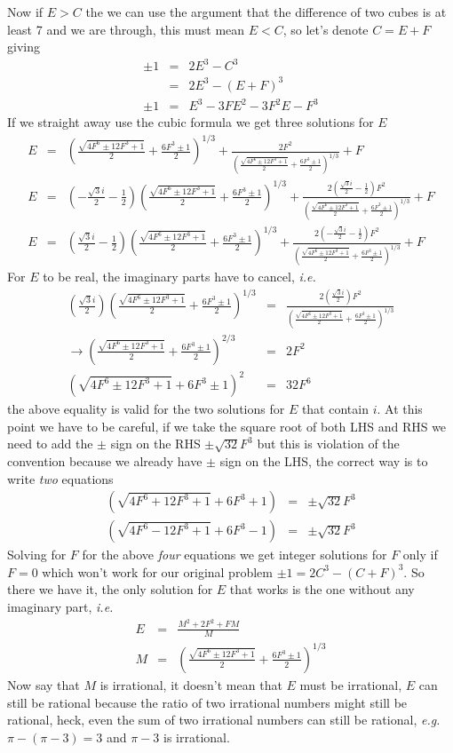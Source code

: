 \documentclass[aps,preprint,preprintnumbers,nofootinbib,showpacs,prd]{revtex4-1}
\newcommand{\ie}{{\it i.e.} }
\newcommand{\eg}{{\it e.g.} }
\newcommand{\nbea}{\begin{eqnarray*}}
\newcommand{\neea}{\end{eqnarray*}}
\begin{document}
Now if $E > C$ the we can use the argument that the difference of two cubes is at least 7 and we are through, this must mean $E < C$, so let's denote $C = E + F$ giving
%
\nbea
\pm 1 & = & 2 E^3 - C^3 \\
& = & 2E^3 - (E + F)^3 \\
\pm 1 & = & E^3-3FE^2-3F^2E-F^3
\neea
%
If we straight away use the cubic formula we get three solutions for $E$
%
\nbea
E & = & \left (\frac{\sqrt{4F^6\pm12F^3+1}}{2}+\frac{6F^3\pm1}{2} \right )^{1/3}+
\frac{2F^2}{  \left (\frac{\sqrt{4F^6\pm12F^3+1}}{2}+\frac{6F^3\pm1}{2} \right )^{1/3}  }+ F \\
E & = & \left ( -\frac{\sqrt{3}i}{2}-\frac{1}{2} \right ) \left (\frac{\sqrt{4F^6\pm12F^3+1}}{2}+\frac{6F^3\pm1}{2} \right )^{1/3}+
\frac{2\left ( \frac{\sqrt{3}i}{2}-\frac{1}{2} \right )F^2}{  \left (\frac{\sqrt{4F^6\pm12F^3+1}}{2}+\frac{6F^3\pm1}{2} \right )^{1/3}  }+ F \\
E & = & \left ( \frac{\sqrt{3}i}{2}-\frac{1}{2} \right )\left (\frac{\sqrt{4F^6\pm12F^3+1}}{2}+\frac{6F^3\pm1}{2} \right )^{1/3}+
\frac{2\left ( -\frac{\sqrt{3}i}{2}-\frac{1}{2} \right )F^2}{  \left (\frac{\sqrt{4F^6\pm12F^3+1}}{2}+\frac{6F^3\pm1}{2} \right )^{1/3}  }+ F
\neea
%
For $E$ to be real, the imaginary parts have to cancel, \ie
%
\nbea
\left ( \frac{\sqrt{3}i}{2} \right )\left (\frac{\sqrt{4F^6\pm12F^3+1}}{2}+\frac{6F^3\pm1}{2} \right )^{1/3} & = & \frac{2\left ( \frac{\sqrt{3}i}{2}\right )F^2}{  \left (\frac{\sqrt{4F^6\pm12F^3+1}}{2}+\frac{6F^3\pm1}{2} \right )^{1/3}  } \\
\to \left (\frac{\sqrt{4F^6\pm12F^3+1}}{2}+\frac{6F^3\pm1}{2} \right )^{2/3} & = & 2F^2 \\
\left (\sqrt{4F^6\pm12F^3+1} + 6F^3\pm1\right )^2 & = & 32F^6
\neea
%
the above equality is valid for the two solutions for $E$ that contain $i$. At this point we have to be careful, if we take the square root of both LHS and RHS we need to add the $\pm$ sign on the RHS $\pm\sqrt{32}F^3$ but this is violation of the convention because we already have $\pm$ sign on the LHS, the correct way is to write {\it two} equations
%
\nbea
\left (\sqrt{4F^6 + 12F^3+1} + 6F^3 + 1\right ) & = & \pm\sqrt{32}F^3 \\
\left (\sqrt{4F^6 - 12F^3+1} + 6F^3 - 1\right ) & = & \pm\sqrt{32}F^3
\neea
%
Solving for $F$ for the above {\it four} equations we get integer solutions for $F$ only if $F=0$ which won't work for our original problem $\pm 1 = 2C^3 - (C+F)^3$. So there we have it, the only solution for $E$ that works is the one without any imaginary part, \ie
%
\nbea
E & = & \frac{M^2+2F^2 + FM}{ M } \\
M & = & \left (\frac{\sqrt{4F^6\pm12F^3+1}}{2}+\frac{6F^3\pm1}{2} \right )^{1/3}
\neea
%
Now say that $M$ is irrational, it doesn't mean that $E$ must be irrational, $E$ can still be rational because the ratio of two irrational numbers might still be rational, heck, even the sum of two irrational numbers can still be rational, \eg $\pi - (\pi - 3) = 3$ and $\pi -3$ is irrational.
\end{document}
